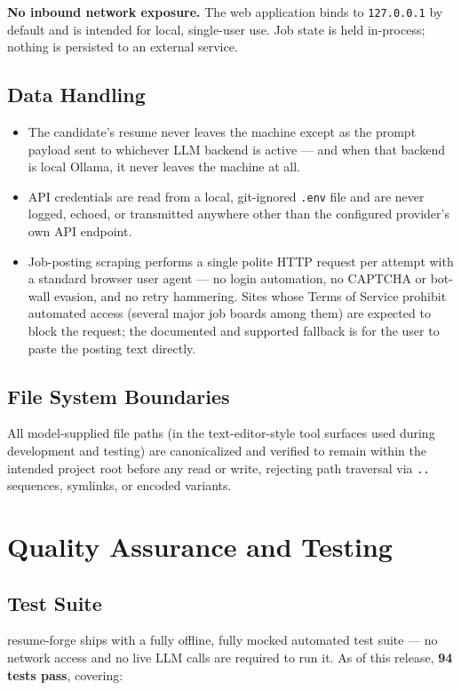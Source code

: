 \documentclass[10.5pt,letterpaper]{article}
\begin{document}
\begin{securitybox}
\textbf{No inbound network exposure.} The web application binds to \texttt{127.0.0.1} by
default and is intended for local, single-user use. Job state is held in-process; nothing is
persisted to an external service.
\end{securitybox}

\subsection{Data Handling}
\begin{itemize}
  \item The candidate's resume never leaves the machine except as the prompt payload sent to
    whichever LLM backend is active --- and when that backend is local Ollama, it never
    leaves the machine at all.
  \item API credentials are read from a local, git-ignored \texttt{.env} file and are never
    logged, echoed, or transmitted anywhere other than the configured provider's own API
    endpoint.
  \item Job-posting scraping performs a single polite HTTP request per attempt with a
    standard browser user agent --- no login automation, no CAPTCHA or bot-wall evasion, and
    no retry hammering. Sites whose Terms of Service prohibit automated access (several major
    job boards among them) are expected to block the request; the documented and supported
    fallback is for the user to paste the posting text directly.
\end{itemize}

\subsection{File System Boundaries}
All model-supplied file paths (in the text-editor-style tool surfaces used during
development and testing) are canonicalized and verified to remain within the intended
project root before any read or write, rejecting path traversal via \texttt{..} sequences,
symlinks, or encoded variants.

\newpage

\section{Quality Assurance and Testing}

\subsection{Test Suite}
resume-forge ships with a fully offline, fully mocked automated test suite --- no network
access and no live LLM calls are required to run it. As of this release, \textbf{94 tests
pass}, covering:
\end{document}
